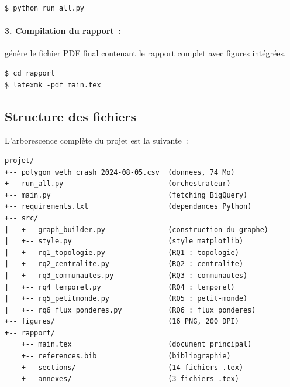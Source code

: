 \begin{lstlisting}[language={}, numbers=none, caption={Lancement des analyses}]
$ python run_all.py
\end{lstlisting}

\paragraph{3. Compilation du rapport~:} g\'en\`ere le fichier PDF final contenant le rapport complet avec figures int\'egr\'ees.

\begin{lstlisting}[language={}, numbers=none, caption={Compilation du rapport LaTeX}]
$ cd rapport
$ latexmk -pdf main.tex
\end{lstlisting}


\subsection{Structure des fichiers}

L'arborescence compl\`ete du projet est la suivante~:

\begin{lstlisting}[language={}, numbers=none, caption={Arborescence du projet}]
projet/
+-- polygon_weth_crash_2024-08-05.csv  (donnees, 74 Mo)
+-- run_all.py                         (orchestrateur)
+-- main.py                            (fetching BigQuery)
+-- requirements.txt                   (dependances Python)
+-- src/
|   +-- graph_builder.py               (construction du graphe)
|   +-- style.py                       (style matplotlib)
|   +-- rq1_topologie.py               (RQ1 : topologie)
|   +-- rq2_centralite.py              (RQ2 : centralite)
|   +-- rq3_communautes.py             (RQ3 : communautes)
|   +-- rq4_temporel.py                (RQ4 : temporel)
|   +-- rq5_petitmonde.py              (RQ5 : petit-monde)
|   +-- rq6_flux_ponderes.py           (RQ6 : flux ponderes)
+-- figures/                           (16 PNG, 200 DPI)
+-- rapport/
    +-- main.tex                       (document principal)
    +-- references.bib                 (bibliographie)
    +-- sections/                      (14 fichiers .tex)
    +-- annexes/                       (3 fichiers .tex)
\end{lstlisting}

